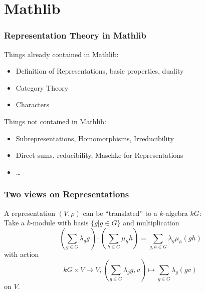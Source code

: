 \documentclass{beamer}
\begin{document}

\section{Mathlib}
\begin{frame}
\frametitle{Representation Theory in Mathlib}
Things already contained in Mathlib:
\begin{itemize}
\item Definition of Representations, basic properties, duality
\item Category Theory
\item Characters
\end{itemize}
\pause
Things not contained in Mathlib:
\begin{itemize}
\item Subrepresentations, Homomorphisms, Irreducibility
\item Direct sums, reducibility, Maschke for Representations
\item \ldots
\end{itemize}
\end{frame}


\begin{frame}
\frametitle{Two views on Representations}
A representation \((V, \rho)\) can be \enquote{translated} to a \(k\)-algebra \(kG\):\\
\pause
Take a \(k\)-module with basis \(\{g\vert g\in G\}\) and multiplication
\begin{equation*}
\left(\sum_{g\in G}\lambda_g g\right)\cdot \left(\sum_{h\in G}\mu_h h\right) = \sum_{g,h\in G} \lambda_g\mu_h (gh)
\end{equation*}
\pause
with action
\begin{equation*}
kG\times V\to V, \left(\sum_{g\in G}\lambda_gg, v\right) \mapsto \sum_{g\in G}\lambda_g(gv)
\end{equation*}
on \(V\).
\end{frame}

\end{document}
